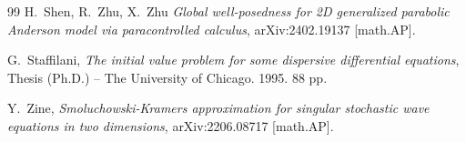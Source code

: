 \documentclass[letterpaper, 11pt,  reqno]{amsart}
\theoremstyle{myremark}
\newcommand{\1}{\hspace{0.5mm}\text{I}\hspace{0.5mm}}
\numberwithin{equation}{section}
\numberwithin{theorem}{section}
\begin{document}
\begin{thebibliography}{99}
H.~Shen, R.~Zhu, X.~Zhu
{\it Global well-posedness for 2D generalized parabolic Anderson model via paracontrolled calculus}, 
arXiv:2402.19137 [math.AP].


G.~Staffilani,
{\it The initial value problem for some dispersive differential equations},
Thesis (Ph.D.) -- The University of Chicago. 1995. 88 pp.




Y.~Zine, 
{\it Smoluchowski-Kramers approximation for singular stochastic wave equations in two dimensions},
arXiv:2206.08717 [math.AP].


\end{thebibliography}
\end{document}
